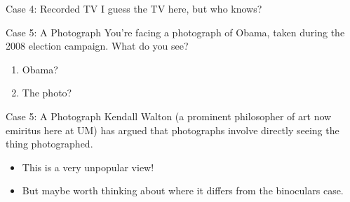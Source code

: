 \documentclass[
  17pt,
  letterpaper,
  ignorenonframetext,
  aspectratio=169,
  handout]{beamer}
\providecommand{\tightlist}{%
  \setlength{\itemsep}{0pt}\setlength{\parskip}{0pt}}\usepackage{longtable,booktabs,array}
\begin{document}
\begin{frame}{Case 4: Recorded TV}
\protect\hypertarget{case-4-recorded-tv-1}{}
I guess the TV here, but who knows?
\end{frame}

\begin{frame}{Case 5: A Photograph}
\protect\hypertarget{case-5-a-photograph}{}
You're facing a photograph of Obama, taken during the 2008 election
campaign. What do you see?

\begin{enumerate}[<+->]
\tightlist
\item
  Obama?
\item
  The photo?
\end{enumerate}
\end{frame}

\begin{frame}{Case 5: A Photograph}
\protect\hypertarget{case-5-a-photograph-1}{}
Kendall Walton (a prominent philosopher of art now emiritus here at UM)
has argued that photographs involve directly seeing the thing
photographed.

\begin{itemize}[<+->]
\tightlist
\item
  This is a very unpopular view!
\item
  But maybe worth thinking about where it differs from the binoculars
  case.
\end{itemize}
\end{frame}
\end{document}
